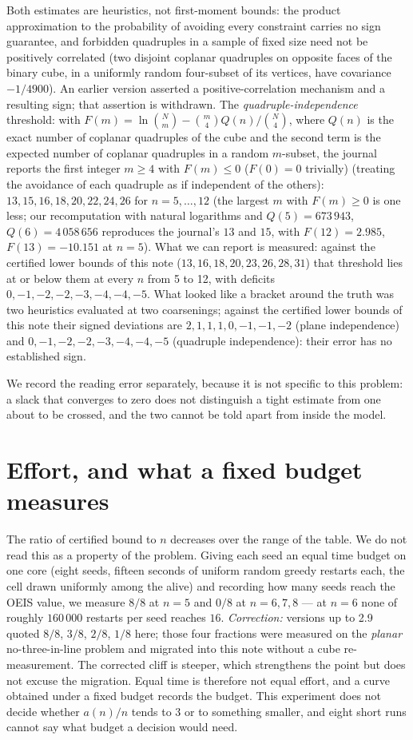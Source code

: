 \documentclass[11pt,a4paper]{article}
\begin{document}
Both estimates are heuristics, not first-moment bounds: the product approximation to the probability
of avoiding every constraint carries no sign guarantee, and forbidden quadruples in a sample of fixed
size need not be positively correlated (two disjoint coplanar quadruples on opposite faces of the
binary cube, in a uniformly random four-subset of its vertices, have covariance $-1/4900$).  An earlier
version asserted a positive-correlation mechanism and a resulting sign; that assertion is withdrawn.
The \emph{quadruple-independence} threshold: with $F(m)=\ln\binom{N}{m}-\binom{m}{4}Q(n)/\binom{N}{4}$, where
$Q(n)$ is the exact number of coplanar quadruples of the cube and the second term is the expected number of
coplanar quadruples in a random $m$-subset, the journal reports the first integer $m\ge4$ with $F(m)\le0$ ($F(0)=0$ trivially) (treating the
avoidance of each quadruple as if independent of the others): $13,15,16,18,20,22,24,26$ for $n=5,\dots,12$ (the
largest $m$ with $F(m)\ge0$ is one less; our recomputation with natural logarithms and $Q(5)=673\,943$, $Q(6)=4\,058\,656$
reproduces the journal's $13$ and $15$, with $F(12)=2.985$, $F(13)=-10.151$ at $n=5$).  What we can
report is measured: against the certified lower bounds of this note ($13,16,18,20,23,26,28,31$) that threshold
lies at or below them at every $n$ from 5 to 12, with deficits $0,-1,-2,-2,-3,-4,-4,-5$.  What looked like a bracket around the truth was two heuristics
evaluated at two coarsenings; against the certified lower bounds of this note their signed deviations are
$2,1,1,1,0,-1,-1,-2$ (plane independence) and $0,-1,-2,-2,-3,-4,-4,-5$ (quadruple independence): their error
has no established sign.

We record the reading error separately, because it is not specific to this problem: a slack that
converges to zero does not distinguish a tight estimate from one about to be crossed, and the two
cannot be told apart from inside the model.

\section{Effort, and what a fixed budget measures}\label{s:effort}
The ratio of certified bound to $n$ decreases over the range of the table.  We do not read this
as a property of the problem.  Giving each seed an equal time budget on one core (eight seeds, fifteen seconds of uniform random
greedy restarts each, the cell drawn uniformly among the alive) and recording how many seeds reach
the OEIS value, we measure $8/8$ at $n=5$ and $0/8$ at $n=6,7,8$ --- at $n=6$ none of roughly
$160\,000$ restarts per seed reaches $16$.  \emph{Correction:} versions up to 2.9 quoted
$8/8$, $3/8$, $2/8$, $1/8$ here; those four fractions were measured on the \emph{planar}
no-three-in-line problem and migrated into this note without a cube re-measurement.  The corrected
cliff is steeper, which strengthens the point but does not excuse the migration.
Equal time is therefore not equal effort, and a curve obtained under a fixed budget records the
budget.  This experiment does not decide whether $a(n)/n$ tends to $3$ or to something smaller,
and eight short runs cannot say what budget a decision would need.
\end{document}
